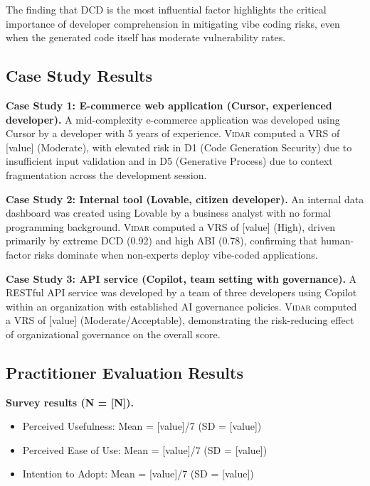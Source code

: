 \documentclass[preprint,review,12pt]{elsarticle}
\newcommand{\vidar}{\textsc{Vidar}}
\begin{document}
The finding that DCD is the most influential factor highlights the critical importance of developer comprehension in mitigating vibe coding risks, even when the generated code itself has moderate vulnerability rates.


\subsection{Case Study Results}
\label{subsec:case_results}

\textbf{Case Study 1: E-commerce web application (Cursor, experienced developer).}
A mid-complexity e-commerce application was developed using Cursor by a developer with 5 years of experience. \vidar{} computed a VRS of [value] (Moderate), with elevated risk in D1 (Code Generation Security) due to insufficient input validation and in D5 (Generative Process) due to context fragmentation across the development session.

\textbf{Case Study 2: Internal tool (Lovable, citizen developer).}
An internal data dashboard was created using Lovable by a business analyst with no formal programming background. \vidar{} computed a VRS of [value] (High), driven primarily by extreme DCD (0.92) and high ABI (0.78), confirming that human-factor risks dominate when non-experts deploy vibe-coded applications.

\textbf{Case Study 3: API service (Copilot, team setting with governance).}
A RESTful API service was developed by a team of three developers using Copilot within an organization with established AI governance policies. \vidar{} computed a VRS of [value] (Moderate/Acceptable), demonstrating the risk-reducing effect of organizational governance on the overall score.


\subsection{Practitioner Evaluation Results}
\label{subsec:practitioner_results}

\textbf{Survey results (N = [N]).}
\begin{itemize}
    \item Perceived Usefulness: Mean = [value]/7 (SD = [value])
    \item Perceived Ease of Use: Mean = [value]/7 (SD = [value])
    \item Intention to Adopt: Mean = [value]/7 (SD = [value])
\end{itemize}
\end{document}
